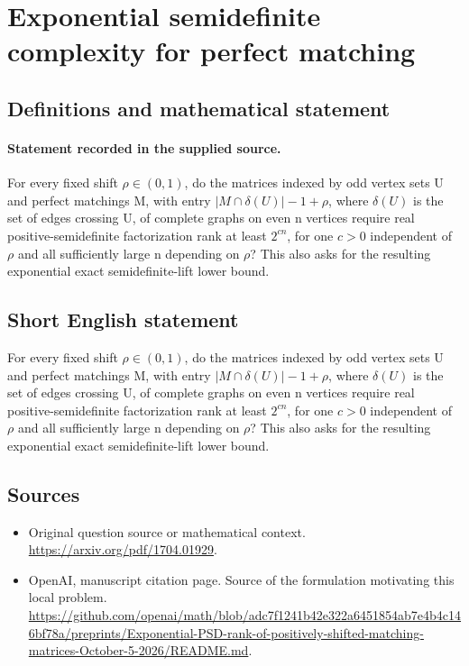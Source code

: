 \documentclass[11pt]{article}
\begin{document}
\section*{Exponential semidefinite complexity for perfect matching}\label{statement}
\subsection{Definitions and mathematical statement}
\paragraph{Statement recorded in the supplied source.}
For every fixed shift $\rho \in (0,1)$, do the matrices indexed by odd vertex sets U and perfect matchings M, with entry $|M\cap \delta (U)|-1+\rho $, where $\delta (U)$ is the set of edges crossing U, of complete graphs on even n vertices require real positive-semidefinite factorization rank at least $2^{cn}$, for one $c>0$ independent of $\rho $ and all sufficiently large n depending on $\rho $? This also asks for the resulting exponential exact semidefinite-lift lower bound.
\subsection{Short English statement}
For every fixed shift $\rho \in (0,1)$, do the matrices indexed by odd vertex sets U and perfect matchings M, with entry $|M\cap \delta (U)|-1+\rho $, where $\delta (U)$ is the set of edges crossing U, of complete graphs on even n vertices require real positive-semidefinite factorization rank at least $2^{cn}$, for one $c>0$ independent of $\rho $ and all sufficiently large n depending on $\rho $? This also asks for the resulting exponential exact semidefinite-lift lower bound.
\subsection{Sources}
\begin{itemize}
\item[S1] Original question source or mathematical context.
\url{https://arxiv.org/pdf/1704.01929}.
\item[S2] OpenAI, manuscript citation page. Source of the formulation motivating this local problem.
\url{https://github.com/openai/math/blob/adc7f1241b42e322a6451854ab7e4b4c146bf78a/preprints/Exponential-PSD-rank-of-positively-shifted-matching-matrices-October-5-2026/README.md}.
\end{itemize}
\end{document}
